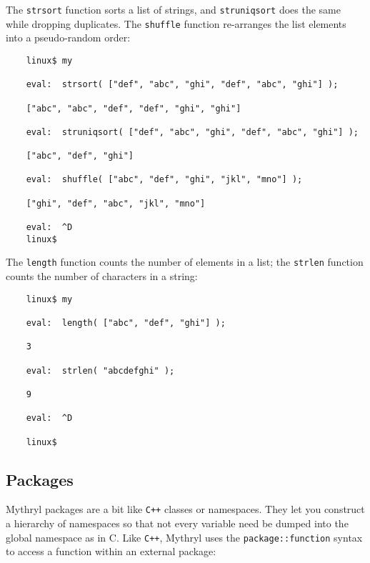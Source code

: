 The {\tt strsort} function sorts a list of strings, and 
{\tt struniqsort} does the same while dropping duplicates. 
The {\tt shuffle} function re-arranges the list elements 
into a pseudo-random order:


\begin{verbatim}
    linux$ my

    eval:  strsort( ["def", "abc", "ghi", "def", "abc", "ghi"] );

    ["abc", "abc", "def", "def", "ghi", "ghi"]

    eval:  struniqsort( ["def", "abc", "ghi", "def", "abc", "ghi"] );

    ["abc", "def", "ghi"]

    eval:  shuffle( ["abc", "def", "ghi", "jkl", "mno"] );

    ["ghi", "def", "abc", "jkl", "mno"]

    eval:  ^D
    linux$
\end{verbatim}

The {\tt length} function counts the number of elements in 
a list;  the {\tt strlen} function counts the number of 
characters in a string:

\begin{verbatim}
    linux$ my

    eval:  length( ["abc", "def", "ghi"] );

    3

    eval:  strlen( "abcdefghi" );

    9

    eval:  ^D

    linux$
\end{verbatim}


\cutend*

\subsection{Packages}
\label{section:tut:bare-essentials:packages}

Mythryl packages are a bit like {\tt C++} classes or namespaces.  They let 
you construct a hierarchy of namespaces so that not every variable 
need be dumped into the global namespace as in C.  Like {\tt C++}, Mythryl 
uses the {\tt package::function} syntax to access a function within an 
external package:

